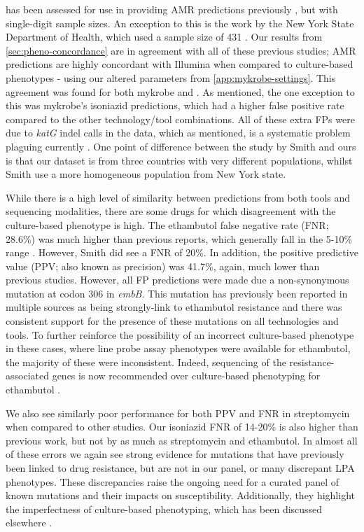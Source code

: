 \ont{} has been assessed for use in providing AMR predictions previously \cite{bradley2015,hunt2019,phelan2019}, but with single-digit sample sizes. An exception to this is the work by the New York State Department of Health, which used a sample size of 431 \cite{smith2020}. Our results from \autoref{sec:pheno-concordance} are in agreement with all of these previous studies; \ont{} AMR predictions are highly concordant with Illumina when compared to culture-based phenotypes - using our altered parameters from \autoref{app:mykrobe-settings}. This agreement was found for both mykrobe and \drprg{}. As mentioned, the one exception to this was mykrobe's \ont{} isoniazid predictions, which had a higher false positive rate compared to the other technology/tool combinations. All of these extra FPs were due to \textit{katG} indel calls in the \ont{} data, which as mentioned, is a systematic problem plaguing \ont{} currently \cite{watson2019}. One point of difference between the \ont{} study by Smith \etal{} and ours is that our dataset is from three countries with very different \mtb{} populations, whilst Smith \etal{} use a more homogeneous population from New York state. 

While there is a high level of similarity between predictions from both tools and sequencing modalities, there are some drugs for which disagreement with the culture-based phenotype is high. The ethambutol false negative rate (FNR; 28.6\%) was much higher than previous reports, which generally fall in the 5-10\% range \cite{cryptic2018,hunt2019,smith2020}. However, Smith \etal{} did see a FNR of 20\%. In addition, the positive predictive value (PPV; also known as precision) was 41.7\%, again, much lower than previous studies. However, all FP predictions were made due a non-synonymous mutation at codon 306 in \textit{embB}. This mutation has previously been reported in multiple sources as being strongly-link to ethambutol resistance \cite{Maningi2017,Srivastava2009,Brossier2015} and there was consistent support for the presence of these mutations on all technologies and tools. To further reinforce the possibility of an incorrect culture-based phenotype in these cases, where line probe assay phenotypes were available for ethambutol, the majority of these were inconsistent. Indeed, sequencing of the resistance-associated genes is now recommended over culture-based phenotyping for ethambutol \cite{who2018technical}. 

We also see similarly poor performance for both PPV and FNR in streptomycin when compared to other studies. Our isoniazid FNR of 14-20\% is also higher than previous work, but not by as much as streptomycin and ethambutol. In almost all of these errors we again see strong evidence for mutations that have previously been linked to drug resistance, but are not in our panel, or many discrepant LPA phenotypes. These discrepancies raise the ongoing need for a curated panel of known mutations and their impacts on susceptibility. Additionally, they highlight the imperfectness of culture-based phenotyping, which has been discussed elsewhere \cite{walker2015, who2018technical,cryptic2018}.

